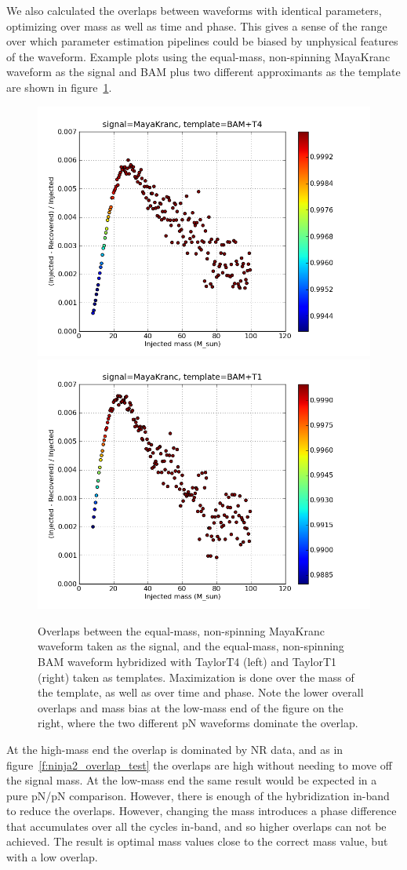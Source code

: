 \clearpage

We also calculated the overlaps between waveforms with identical
parameters, optimizing over mass as well as time and phase.  This gives
a sense of the range over which parameter estimation pipelines could 
be biased by unphysical features of the waveform.  Example plots
using the equal-mass, non-spinning MayaKranc waveform as the signal and
BAM plus two different approximants as the template are shown in 
figure~\ref{f:ninja2_max_over_mass_bam}.


\begin{figure}
  \includegraphics[width=0.5\linewidth]{figures/ninja2/maya_bamt4_max_over_m}
  \includegraphics[width=0.5\linewidth]{figures/ninja2/maya_bamt1_max_over_m}
  \caption[Overlaps between NINJA-2 submissions maximized over mass]{
  \label{f:ninja2_max_over_mass_bam}
Overlaps between the equal-mass, non-spinning MayaKranc waveform taken
as the signal, and the equal-mass, non-spinning BAM waveform
hybridized with TaylorT4 (left) and TaylorT1 (right) taken as
templates.  Maximization is done over the mass of the template, as well
as over time and phase.  Note the lower overall overlaps and mass bias
at the low-mass end of the figure on the right, where the two different
pN waveforms dominate the overlap.}
\end{figure}%

At the high-mass end the overlap is dominated by NR data, and as in
figure~\ref{f:ninja2_overlap_test} the overlaps are high without
needing to move off the signal mass.  At the low-mass end the same
result would be expected in a pure pN/pN comparison.  However, there
is enough of the hybridization in-band to reduce the overlaps.  However,
changing the mass introduces a phase difference that accumulates over
all the cycles in-band, and so higher overlaps can not be achieved.
The result is optimal mass values close to the correct mass value, but
with a low overlap.

